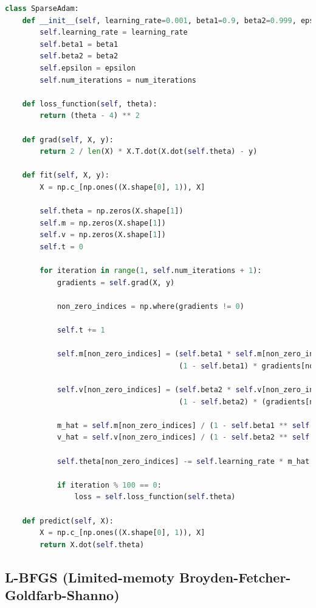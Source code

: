 \begin{lstlisting}[language=Python]
class SparseAdam:
    def __init__(self, learning_rate=0.001, beta1=0.9, beta2=0.999, epsilon=1e-8, num_iterations=1000):
        self.learning_rate = learning_rate
        self.beta1 = beta1
        self.beta2 = beta2
        self.epsilon = epsilon
        self.num_iterations = num_iterations

    def loss_function(self, theta):
        return (theta - 4) ** 2

    def grad(self, X, y):
        return 2 / len(X) * X.T.dot(X.dot(self.theta) - y)    

    def fit(self, X, y):
        X = np.c_[np.ones((X.shape[0], 1)), X]

        self.theta = np.zeros(X.shape[1])
        self.m = np.zeros(X.shape[1])
        self.v = np.zeros(X.shape[1])
        self.t = 0

        for iteration in range(1, self.num_iterations + 1):
            gradients = self.grad(X, y)

            non_zero_indices = np.where(gradients != 0)

            self.t += 1

            self.m[non_zero_indices] = (self.beta1 * self.m[non_zero_indices] +
                                        (1 - self.beta1) * gradients[non_zero_indices])
            
            self.v[non_zero_indices] = (self.beta2 * self.v[non_zero_indices] +
                                        (1 - self.beta2) * (gradients[non_zero_indices] ** 2))

            m_hat = self.m[non_zero_indices] / (1 - self.beta1 ** self.t)
            v_hat = self.v[non_zero_indices] / (1 - self.beta2 ** self.t)

            self.theta[non_zero_indices] -= self.learning_rate * m_hat / (np.sqrt(v_hat) + self.epsilon)

            if iteration % 100 == 0:
                loss = self.loss_function(self.theta)

    def predict(self, X):
        X = np.c_[np.ones((X.shape[0], 1)), X]
        return X.dot(self.theta)
\end{lstlisting}

\newpage

\subsection{L-BFGS (Limited-memoty Broyden-Fetcher-Goldfarb-Shanno)}

